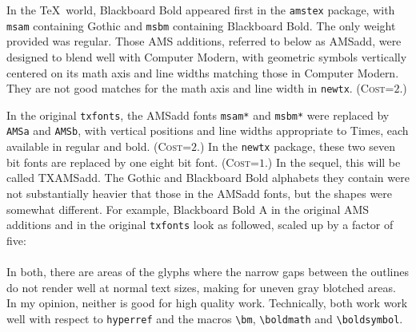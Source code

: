 \documentclass[\fsc]{article}
\theoremstyle{oldplain}
\theoremstyle{plain}
\begin{document}
In the \TeX\ world, Blackboard Bold appeared first in the {\tt amstex} package, with {\tt msam} containing Gothic and {\tt msbm} containing Blackboard Bold. The only weight provided was regular. Those AMS additions, referred to below as \textsf{AMSadd},  were designed to blend well with Computer Modern, with geometric symbols vertically centered on its math axis and line widths matching those in Computer Modern. They are not good matches for the math axis and line width in {\tt newtx}.  (\textsc{Cost}=$2$.)

In the original {\tt txfonts}, the \textsf{AMSadd} fonts \verb|msam*| and \verb|msbm*| were replaced by {\tt AMSa} and {\tt AMSb}, with vertical positions and line widths appropriate to Times, each available in regular and bold. (\textsc{Cost}=$2$.) In the {\tt newtx} package, these two seven bit fonts are replaced by one eight bit font. (\textsc{Cost}=$1$.) In the sequel, this will be called \textsf{TXAMSadd}. The Gothic and Blackboard Bold alphabets they contain were not substantially heavier that those in the \textsf{AMSadd} fonts, but the shapes were somewhat different. For example, Blackboard Bold A in the original AMS additions and in the original {\tt txfonts} look as followed, scaled up by a factor of five:\\
 {}\\
In both, there are areas of the glyphs where the narrow gaps between the outlines do not render well at normal text sizes, making for uneven gray blotched areas. In my opinion, neither is good for high quality work. Technically, both work work well with respect to \verb|hyperref| and the macros \verb|\bm|, \verb|\boldmath|  and \verb|\boldsymbol|. 
\end{document}
